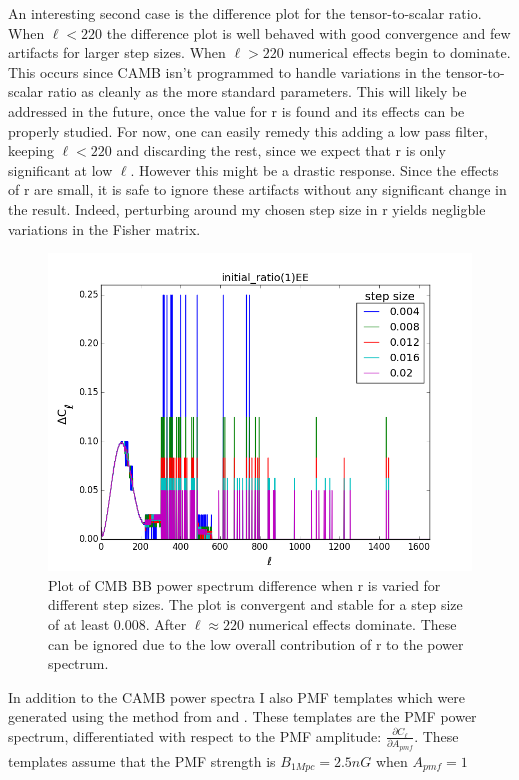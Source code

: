 An interesting second case is the difference plot for the tensor-to-scalar ratio. When $\ell < 220$ the difference plot is well behaved with good convergence and few artifacts for larger step sizes. When $\ell > 220$ numerical effects begin to dominate. This occurs since CAMB isn't programmed to handle variations in the tensor-to-scalar ratio as cleanly as the more standard parameters. This will likely be addressed in the future, once the value for r is found and its effects can be properly studied. For now, one can easily remedy this adding a low pass filter, keeping $\ell < 220$ and discarding the rest, since we expect that r is only significant at low $\ell$. However this might be a drastic response. Since the effects of r are small, it is safe to ignore these artifacts without any significant change in the result. Indeed, perturbing around my chosen step size in r yields negligble variations in the Fisher matrix.

\begin{figure}[h]
\centering
\includegraphics[scale=0.75]{images/diffs/reez.png}
\caption{Plot of CMB BB power spectrum difference when r is varied for different step sizes. The plot is convergent and stable for a step size of at least 0.008. After $\ell \approx 220$ numerical effects dominate. These can be ignored due to the low overall contribution of r to the power spectrum.}
\label{fig:diffr}
\end{figure}
 
 
In addition to the CAMB power spectra I also PMF templates which were generated using the method from \cite{Ade:2015cao} and \cite{PhysRevD.80.023510}. These templates are the PMF power spectrum, differentiated with respect to the PMF amplitude: $\frac{\partial C_{\ell}}{\partial A_{pmf}}$.
These templates assume that the PMF strength is $B_{1Mpc} = 2.5nG$ when $A_{pmf} = 1$

